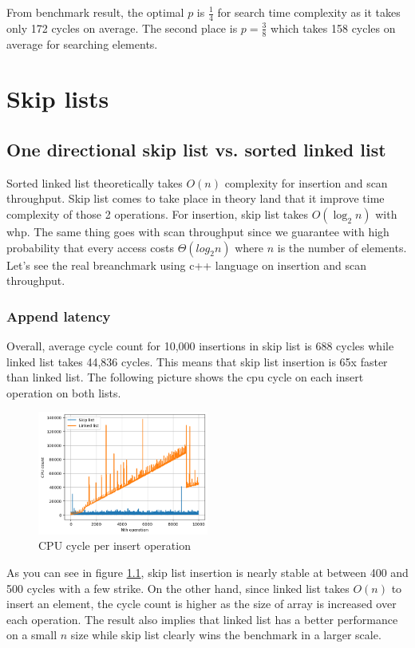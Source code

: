 \documentclass[a4paper, 12pt]{report}
\begin{document}
From benchmark result, the optimal $p$ is $\frac{1}{4}$ for search time complexity as it takes only 172 cycles on average.
The second place is $p = \frac{3}{8}$ which takes 158 cycles on average for searching elements.


\chapter{Skip lists}

\section{One directional skip list vs. sorted linked list}

Sorted linked list theoretically takes $O(n)$ complexity for insertion and scan throughput. 
Skip list comes to take place in theory land that it improve time complexity of those 2 operations.
For insertion, skip list takes $O(\log_2 n)$ with whp. The same thing goes with scan throughput since
we guarantee with high probability that every access costs $\Theta(log_2 n)$ where $n$ is the number of elements.
Let's see the real breanchmark using c++ language on insertion and scan throughput.


\subsection{Append latency}
Overall, average cycle count for 10,000 insertions in skip list is 688 cycles while 
linked list takes 44,836 cycles. This means that skip list insertion is 65x faster than linked list.
The following picture shows the cpu cycle on each insert operation on both lists.

\begin{figure}[h]
        \centering
        \includegraphics[width=0.5\textwidth,scale=0.5]{skip_list_insert.png}
        \caption{\label{fig:skip_list_insert} CPU cycle per insert operation}
\end{figure}

As you can see in figure \ref{fig:skip_list_insert}, skip list insertion is nearly stable at between 400 and 500 cycles with a few strike.
On the other hand, since linked list takes $O(n)$ to insert an element, the cycle count is higher as the size of array is increased over each operation.
The result also implies that linked list has a better performance on a small $n$ size while skip list clearly wins the benchmark in a larger scale.
\end{document}
